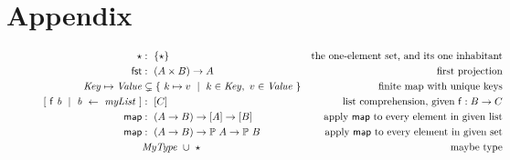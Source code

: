 \section{Appendix}

\begin{figure}[htb]
  \begin{align*}
    \emptytype
    & :~\{\emptytype \}
    & \text{the one-element set, and its one inhabitant}
    \\
    \fun{fst}
    & :~(A \times B) \to A
    & \text{first projection}
    \\
    \var{Key} \mapsto \var{Value}
    & \subsetneq \{~ k \mapsto v ~\mid~ k \in \var{Key},~v \in \var{Value}~ \}
    & \text{finite map with unique keys}
    \\
    [~\fun{f}~\var{b}~\mid~\var{b} ~\leftarrow ~\var{myList}~]
    & :~[C]
    & \text{list comprehension, given $\fun{f} : B \to C$}
    \\
    \fun{map}
    & :~(A \to B) \to [A] \to [B]
    & \text{apply $\fun{map}$ to every element in given list}
    \\
    \fun{map}
    & :~(A \to B) \to \powerset{A} \to \powerset{B}
    & \text{apply $\fun{map}$ to every element in given set}
    \\
     & \var{MyType}~ \cup ~\emptytype
    & \text{maybe type}

\end{align*}
\end{figure}
